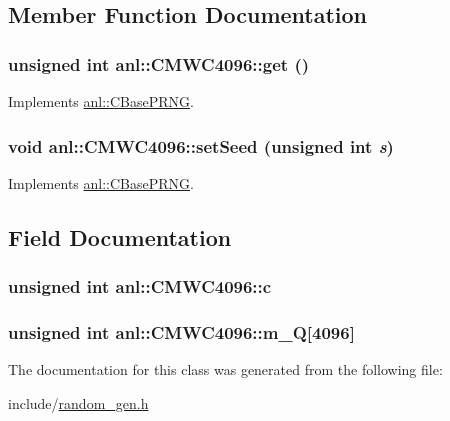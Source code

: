 \subsection{Member Function Documentation}
\hypertarget{classanl_1_1CMWC4096_a28729ce8c6c8dab8cf551c7ddc2b751b}{
\subsubsection[{get}]{\setlength{\rightskip}{0pt plus 5cm}unsigned int anl::CMWC4096::get ()}}
\label{classanl_1_1CMWC4096_a28729ce8c6c8dab8cf551c7ddc2b751b}


Implements \hyperlink{classanl_1_1CBasePRNG_a7a0fcd0d3c4b0f9f160835b4b254a1ed}{anl::CBasePRNG}.\hypertarget{classanl_1_1CMWC4096_a6bac258bda47aff87e640cae6145c970}{
\subsubsection[{setSeed}]{\setlength{\rightskip}{0pt plus 5cm}void anl::CMWC4096::setSeed (unsigned int {\em s})}}
\label{classanl_1_1CMWC4096_a6bac258bda47aff87e640cae6145c970}


Implements \hyperlink{classanl_1_1CBasePRNG_a6e9a81522fe055749739e4d79b5aa27e}{anl::CBasePRNG}.

\subsection{Field Documentation}
\hypertarget{classanl_1_1CMWC4096_a2531fc0da503077dc09feed8cb61c542}{
\subsubsection[{c}]{\setlength{\rightskip}{0pt plus 5cm}unsigned int {\bf anl::CMWC4096::c}}}
\label{classanl_1_1CMWC4096_a2531fc0da503077dc09feed8cb61c542}
\hypertarget{classanl_1_1CMWC4096_a594e1e21a870c7481a6f17ed61a72f24}{
\subsubsection[{m\_\-Q}]{\setlength{\rightskip}{0pt plus 5cm}unsigned int {\bf anl::CMWC4096::m\_\-Q}\mbox{[}4096\mbox{]}}}
\label{classanl_1_1CMWC4096_a594e1e21a870c7481a6f17ed61a72f24}


The documentation for this class was generated from the following file:\begin{DoxyCompactItemize}
\item 
include/\hyperlink{random__gen_8h}{random\_\-gen.h}\end{DoxyCompactItemize}
